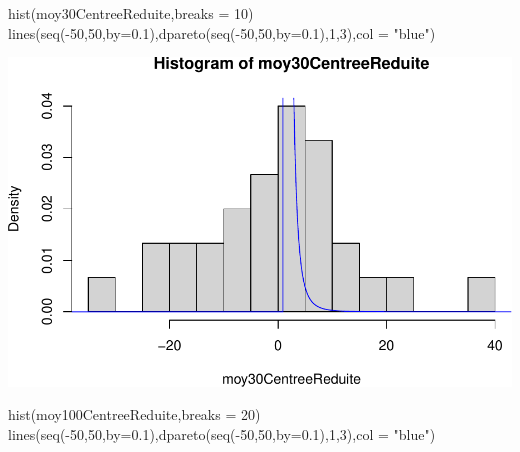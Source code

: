 \documentclass[
]{article}
\newenvironment{Shaded}{\begin{snugshade}}{\end{snugshade}}
\newcommand{\AttributeTok}[1]{\textcolor[rgb]{0.77,0.63,0.00}{#1}}
\newcommand{\DecValTok}[1]{\textcolor[rgb]{0.00,0.00,0.81}{#1}}
\newcommand{\FloatTok}[1]{\textcolor[rgb]{0.00,0.00,0.81}{#1}}
\newcommand{\FunctionTok}[1]{\textcolor[rgb]{0.00,0.00,0.00}{#1}}
\newcommand{\NormalTok}[1]{#1}
\newcommand{\SpecialCharTok}[1]{\textcolor[rgb]{0.00,0.00,0.00}{#1}}
\newcommand{\StringTok}[1]{\textcolor[rgb]{0.31,0.60,0.02}{#1}}
\begin{document}
\begin{Shaded}
\begin{Highlighting}[]
\FunctionTok{hist}\NormalTok{(moy30CentreeReduite,}\AttributeTok{breaks =} \DecValTok{10}\NormalTok{)}
\FunctionTok{lines}\NormalTok{(}\FunctionTok{seq}\NormalTok{(}\SpecialCharTok{{-}}\DecValTok{50}\NormalTok{,}\DecValTok{50}\NormalTok{,}\AttributeTok{by=}\FloatTok{0.1}\NormalTok{),}\FunctionTok{dpareto}\NormalTok{(}\FunctionTok{seq}\NormalTok{(}\SpecialCharTok{{-}}\DecValTok{50}\NormalTok{,}\DecValTok{50}\NormalTok{,}\AttributeTok{by=}\FloatTok{0.1}\NormalTok{),}\DecValTok{1}\NormalTok{,}\DecValTok{3}\NormalTok{),}\AttributeTok{col =} \StringTok{"blue"}\NormalTok{)}
\end{Highlighting}
\end{Shaded}

\includegraphics{tp2_files/figure-latex/normalisation-2.pdf}

\begin{Shaded}
\begin{Highlighting}[]
\FunctionTok{hist}\NormalTok{(moy100CentreeReduite,}\AttributeTok{breaks =} \DecValTok{20}\NormalTok{)}
\FunctionTok{lines}\NormalTok{(}\FunctionTok{seq}\NormalTok{(}\SpecialCharTok{{-}}\DecValTok{50}\NormalTok{,}\DecValTok{50}\NormalTok{,}\AttributeTok{by=}\FloatTok{0.1}\NormalTok{),}\FunctionTok{dpareto}\NormalTok{(}\FunctionTok{seq}\NormalTok{(}\SpecialCharTok{{-}}\DecValTok{50}\NormalTok{,}\DecValTok{50}\NormalTok{,}\AttributeTok{by=}\FloatTok{0.1}\NormalTok{),}\DecValTok{1}\NormalTok{,}\DecValTok{3}\NormalTok{),}\AttributeTok{col =} \StringTok{"blue"}\NormalTok{)}
\end{Highlighting}
\end{Shaded}
\end{document}
